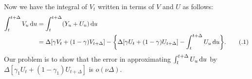 \documentclass{ws-ijfe}
\newcommand\numberthis{\addtocounter{equation}{1}\tag{\theequation}}
\begin{document}
Now we have the integral of $V_t$ written in terms of $V$ and $U$ as follows:
\begin{align*}
   \int_{t}^{t+\Delta}V_u\,\d u &= \int_{t}^{t+\Delta}(Y_u+U_u)\,\d u\\
   &=\Delta[\gamma  V_t+(1-\gamma ) V_{t+\Delta}]-\bigg\{\Delta[\gamma  U_t+(1-\gamma ) U_{t+\Delta}]-\int_{t}^{t+\Delta}U_u\,\d u\bigg\}.\numberthis\label{intV_U}
\end{align*}
Our problem is to show that the error in approximating $\int_{t}^{t+\Delta}U_u\,\mathrm{d} u$ by\\ $\Delta[\gamma_1 U_t+(1-\gamma_1) U_{t+\Delta}]$ is $o(\nu\Delta)$.
\end{document}
